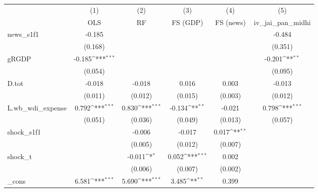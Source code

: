 {
\def\sym#1{\ifmmode^{#1}\else\(^{#1}\)\fi}
\begin{tabular}{l*{5}{c}}
\toprule
            &\multicolumn{1}{c}{(1)}&\multicolumn{1}{c}{(2)}&\multicolumn{1}{c}{(3)}&\multicolumn{1}{c}{(4)}&\multicolumn{1}{c}{(5)}\\
            &\multicolumn{1}{c}{OLS}&\multicolumn{1}{c}{RF}&\multicolumn{1}{c}{FS (GDP)}&\multicolumn{1}{c}{FS (news)}&\multicolumn{1}{c}{iv\_jai\_pan\_midhi}\\
\midrule
news\_s1f1   &      -0.185         &                     &                     &                     &      -0.484         \\
            &     (0.168)         &                     &                     &                     &     (0.351)         \\
\addlinespace
gRGDP       &      -0.185\sym{***}&                     &                     &                     &      -0.201\sym{**} \\
            &     (0.054)         &                     &                     &                     &     (0.095)         \\
\addlinespace
D.tot       &      -0.018         &      -0.018         &       0.016         &       0.003         &      -0.013         \\
            &     (0.011)         &     (0.012)         &     (0.015)         &     (0.003)         &     (0.012)         \\
\addlinespace
L.wb\_wdi\_expense&       0.792\sym{***}&       0.830\sym{***}&      -0.134\sym{**} &      -0.021         &       0.798\sym{***}\\
            &     (0.051)         &     (0.036)         &     (0.049)         &     (0.013)         &     (0.057)         \\
\addlinespace
shock\_s1f1  &                     &      -0.006         &      -0.017         &       0.017\sym{**} &                     \\
            &                     &     (0.005)         &     (0.012)         &     (0.007)         &                     \\
\addlinespace
shock\_t     &                     &      -0.011\sym{*}  &       0.052\sym{***}&       0.002         &                     \\
            &                     &     (0.006)         &     (0.007)         &     (0.002)         &                     \\
\addlinespace
\_cons      &       6.581\sym{***}&       5.690\sym{***}&       3.485\sym{**} &       0.399         &                     \\

\end{tabular}}
